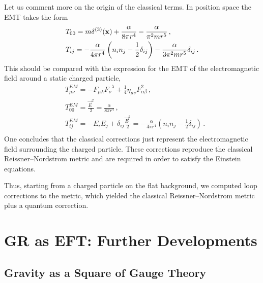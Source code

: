 \documentclass[12pt]{article}
\newcommand{\be}{\begin{equation}}
\newcommand{\ee}{\end{equation}}
\newcommand\m{\mu}
\newcommand\n{\nu}
\renewcommand\a{\alpha}
\renewcommand\b{\beta}
\renewcommand\l{\lambda}
\begin{document}
Let us comment more on the origin of the classical terms.
In position space the EMT takes the form
\be
\begin{split}
& T_{00}=m\delta^{(3)}({\bf x}) +\frac{\alpha}{8\pi r^4}-\frac{\alpha}{\pi^2 m r^5}\,,\\
& T_{ij}=-\frac{\alpha}{4\pi r^4}\left(n_in_j-\frac{1}{2}\delta_{ij}\right)-
\frac{\alpha}{3\pi^2 m r^5}\delta_{ij}\,.
\end{split}
\ee
This should be compared with the expression for the EMT of the electromagnetic field around a static charged particle,
\be
\begin{split}
& T^{EM}_{\m \n}=-F_{\m \l}F^{\;\;\l}_{\n} +\frac{1}{4}\eta_{\m \n} F_{\a \b}^2\,,\\
& T^{EM}_{00}=\frac{\vec E^2}{2}=\frac{\a}{8\pi r^4}\,,\\
& T^{EM}_{ij}=-E_iE_j+\delta_{ij}\frac{\vec E^2}{2}=-\frac{\a}{4\pi r^4}\left(n_in_j-\frac{1}{2}\delta_{ij}\right)\,.\\
\end{split}
\ee
One concludes that the classical corrections just represent the electromagnetic field
surrounding the charged particle. These corrections reproduce the classical Reissner--Nordstr$\ddot{\text{o}}$m metric and are required in order to satisfy the Einstein equations.

Thus, starting from a charged particle on the flat background, we computed loop corrections
to the metric, which yielded the classical Reissner--Nordstr$\ddot{\text{o}}$m metric
plus a quantum correction.

\section{GR as EFT: Further Developments}


\subsection{Gravity as a Square of Gauge Theory}
\end{document}
